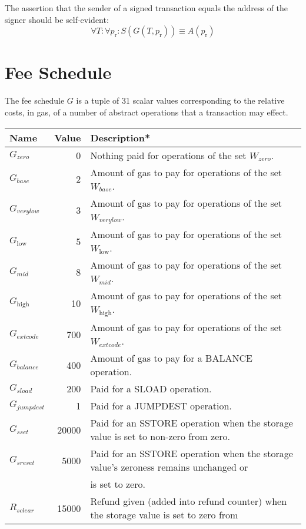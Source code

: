 \documentclass[9pt,oneside]{amsart}
\begin{document}
The assertion that the sender of a signed transaction equals the address of the signer should be self-evident:
\begin{equation}
\forall T: \forall p_{\mathrm{r}}: S(G(T, p_{\mathrm{r}})) \equiv A(p_{\mathrm{r}})
\end{equation}

\section{Fee Schedule}\label{app:fees}

The fee schedule $G$ is a tuple of 31 scalar values corresponding to the relative costs, in gas, of a number of abstract operations that a transaction may effect.

\begin{tabu}{l r l}
\toprule
Name & Value & Description* \\
\midrule
$G_{zero}$ & 0 & Nothing paid for operations of the set {\small $W_{zero}$}. \\
$G_{base}$ & 2 & Amount of gas to pay for operations of the set {\small $W_{base}$}. \\
$G_{verylow}$ & 3 & Amount of gas to pay for operations of the set {\small $W_{verylow}$}. \\
$G_{\mathrm{low}}$ & 5 & Amount of gas to pay for operations of the set {\small $W_{\mathrm{low}}$}. \\
$G_{mid}$ & 8 & Amount of gas to pay for operations of the set {\small $W_{mid}$}. \\
$G_{\mathrm{high}}$ & 10 & Amount of gas to pay for operations of the set {\small $W_{\mathrm{high}}$}. \\
$G_{extcode}$ & 700 & Amount of gas to pay for operations of the set {\small $W_{extcode}$}. \\
$G_{balance}$ & 400 & Amount of gas to pay for a {\small BALANCE} operation. \\
$G_{sload}$ & 200 & Paid for a {\small SLOAD} operation. \\
$G_{jumpdest}$ & 1 & Paid for a {\small JUMPDEST} operation. \\
$G_{sset}$ & 20000 & Paid for an {\small SSTORE} operation when the storage value is set to non-zero from zero. \\
$G_{sreset}$ & 5000 & Paid for an {\small SSTORE} operation when the storage value's zeroness remains unchanged or\\
&&is set to zero. \\
$R_{sclear}$ & 15000 & Refund given (added into refund counter) when the storage value is set to zero from\\

\end{tabu}
\end{document}
